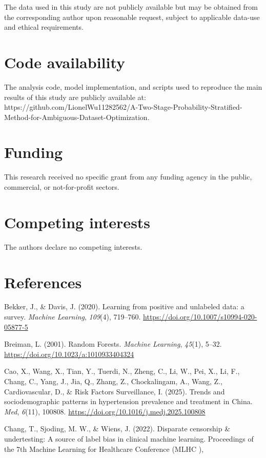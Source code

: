 \documentclass[10pt]{article}
\begin{document}
The data used in this study are not publicly available but may be
obtained from the corresponding author upon reasonable request, subject
to applicable data-use and ethical requirements.

\section*{Code availability}

The analysis code, model implementation, and scripts used to reproduce
the main results of this study are publicly available at: {}https://github.com/LionelWu11282562/A-Two-Stage-Probability-Stratified-Method-for-Ambiguous-Dataset-Optimization{}.

\section*{Funding}

This research received no specific grant from any funding agency in the
public, commercial, or not-for-profit sectors.

\section*{Competing interests}

The authors declare no competing interests.

\balance
\section*{References}\begingroup\footnotesize\setlength{\parindent}{0pt}\setlength{\parskip}{3pt}

Bekker, J., \& Davis, J. (2020). Learning from positive and unlabeled
data: a survey. \emph{Machine Learning}, \emph{109}(4), 719--760.
\url{https://doi.org/10.1007/s10994-020-05877-5}

Breiman, L. (2001). Random Forests. \emph{Machine Learning},
\emph{45}(1), 5--32. \url{https://doi.org/10.1023/a:1010933404324}

Cao, X., Wang, X., Tian, Y., Tuerdi, N., Zheng, C., Li, W., Pei, X., Li,
F., Chang, C., Yang, J., Jia, Q., Zhang, Z., Chockalingam, A., Wang, Z.,
Cardiovascular, D., \& Risk Factors Surveillance, I. (2025). Trends and
sociodemographic patterns in hypertension prevalence and treatment in
China. \emph{Med}, \emph{6}(11), 100808.
\url{https://doi.org/10.1016/j.medj.2025.100808}

Chang, T., Sjoding, M. W., \& Wiens, J. (2022). Disparate censorship \&
undertesting: A source of label bias in clinical machine learning.
Proceedings of the 7th Machine Learning for Healthcare Conference (MLHC
),
\end{document}
